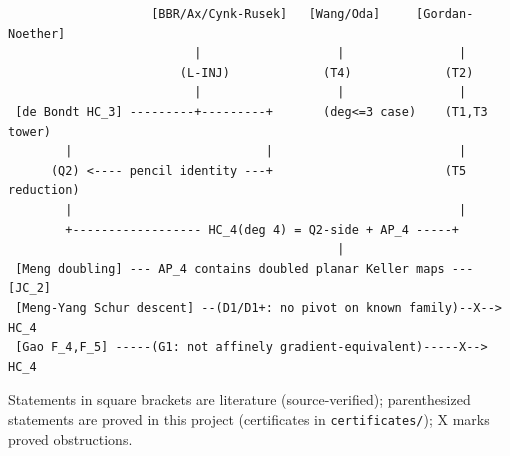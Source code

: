 \documentclass[11pt]{article}
\theoremstyle{plain}
\theoremstyle{definition}
\begin{document}
\begin{verbatim}
                    [BBR/Ax/Cynk-Rusek]   [Wang/Oda]     [Gordan-Noether]
                          |                   |                |
                        (L-INJ)             (T4)             (T2)
                          |                   |                |
 [de Bondt HC_3] ---------+---------+       (deg<=3 case)    (T1,T3 tower)
        |                           |                          |
      (Q2) <---- pencil identity ---+                        (T5 reduction)
        |                                                      |
        +------------------ HC_4(deg 4) = Q2-side + AP_4 -----+
                                              |
 [Meng doubling] --- AP_4 contains doubled planar Keller maps --- [JC_2]
 [Meng-Yang Schur descent] --(D1/D1+: no pivot on known family)--X--> HC_4
 [Gao F_4,F_5] -----(G1: not affinely gradient-equivalent)-----X--> HC_4
\end{verbatim}

Statements in square brackets are literature (source-verified); parenthesized
statements are proved in this project (certificates in
\texttt{certificates/}); X marks proved obstructions.
\end{document}

